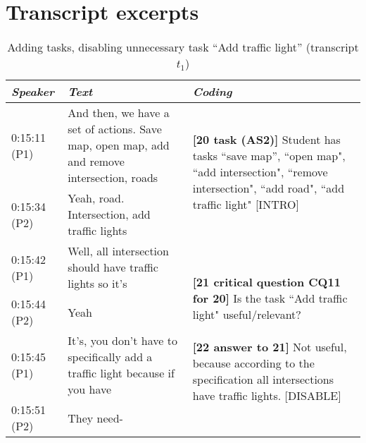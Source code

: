 \section{Transcript excerpts}
\label{sect:transcripts:excerpts}

\begin{table}[!htbp]
\centering
\begin{tabular}{|p{17mm}|p{63mm}|p{70mm}|}
\hline
\textit{Speaker} & \textit{Text} & \textit{Coding}\\
\hline
0:15:11 (P1) & And then, we have a set of actions. Save map, open map, add and remove intersection, roads & \multirow{2}{70mm}{\textbf{[20 task (AS2)]} Student has tasks ``save map'', ``open map", ``add intersection", ``remove intersection", ``add road", ``add traffic light" \textsf{[INTRO]}}\\
\cline{1-2}
0:15:34 (P2) & Yeah, road. Intersection, add traffic lights &\\
\hline
0:15:42 (P1) & Well, all intersection should have traffic lights so it's & \multirow{4}{70mm}{\textbf{[21 critical question CQ11 for 20]} Is the task ``Add traffic light" useful/relevant?\newline\newline
\textbf{[22 answer to 21]} Not useful, because according to the specification all intersections have traffic lights. \textsf{[DISABLE]}}\\
\cline{1-2}
0:15:44 (P2) & Yeah &\\
\cline{1-2}
0:15:45 (P1) & It's, you don't have to specifically add a traffic light because if you have &\\
\cline{1-2}
0:15:51 (P2)	& They need-&\\
\hline
\end{tabular}
\caption{Adding tasks, disabling unnecessary task ``Add traffic light'' (transcript $t_1$)}
\label{table:transcripts:traffic-light}
\end{table}

